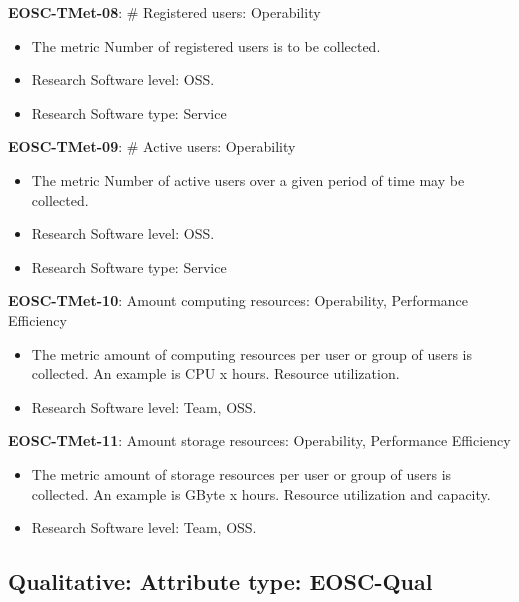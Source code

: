 \textbf{EOSC-TMet-08}: \# Registered users: Operability

\begin{itemize}
    \item The metric Number of registered users is to be collected.~\cite{orviz_fernandez_eosc-synergy_2020}
    \item Research Software level: OSS.
    \item Research Software type: Service
\end{itemize}

\textbf{EOSC-TMet-09}: \# Active users: Operability

\begin{itemize}
    \item The metric Number of active users over a given period of time may be collected.~\cite{orviz_fernandez_eosc-synergy_2020}
    \item Research Software level: OSS.
    \item Research Software type: Service
\end{itemize}

\textbf{EOSC-TMet-10}: Amount computing resources: Operability, Performance Efficiency

\begin{itemize}
    \item The metric amount of computing resources per user or group of users is collected. An example is CPU x hours. Resource utilization.~\cite{iso_25010_2011_2017,orviz_fernandez_eosc-synergy_2020}
    \item Research Software level: Team, OSS.
\end{itemize}

\textbf{EOSC-TMet-11}: Amount storage resources: Operability, Performance Efficiency

\begin{itemize}
    \item The metric amount of storage resources per user or group of users is collected. An example is GByte x hours. Resource utilization and capacity.~\cite{iso_25010_2011_2017,orviz_fernandez_eosc-synergy_2020}
    \item Research Software level: Team, OSS.
\end{itemize}

\subsection{Qualitative: Attribute type: EOSC-Qual}

